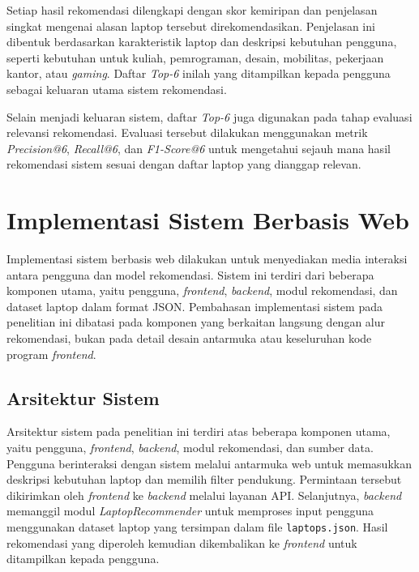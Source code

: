 Setiap hasil rekomendasi dilengkapi dengan skor kemiripan dan penjelasan singkat mengenai alasan laptop tersebut direkomendasikan. Penjelasan ini dibentuk berdasarkan karakteristik laptop dan deskripsi kebutuhan pengguna, seperti kebutuhan untuk kuliah, pemrograman, desain, mobilitas, pekerjaan kantor, atau \textit{gaming}. Daftar \textit{Top-6} inilah yang ditampilkan kepada pengguna sebagai keluaran utama sistem rekomendasi.

Selain menjadi keluaran sistem, daftar \textit{Top-6} juga digunakan pada tahap evaluasi relevansi rekomendasi. Evaluasi tersebut dilakukan menggunakan metrik \textit{Precision@6}, \textit{Recall@6}, dan \textit{F1-Score@6} untuk mengetahui sejauh mana hasil rekomendasi sistem sesuai dengan daftar laptop yang dianggap relevan.

\section{Implementasi Sistem Berbasis Web}
Implementasi sistem berbasis web dilakukan untuk menyediakan media interaksi antara pengguna dan model rekomendasi. Sistem ini terdiri dari beberapa komponen utama, yaitu pengguna, \textit{frontend}, \textit{backend}, modul rekomendasi, dan dataset laptop dalam format JSON. Pembahasan implementasi sistem pada penelitian ini dibatasi pada komponen yang berkaitan langsung dengan alur rekomendasi, bukan pada detail desain antarmuka atau keseluruhan kode program \textit{frontend}.

\subsection{Arsitektur Sistem}
Arsitektur sistem pada penelitian ini terdiri atas beberapa komponen utama, yaitu pengguna, \textit{frontend}, \textit{backend}, modul rekomendasi, dan sumber data. Pengguna berinteraksi dengan sistem melalui antarmuka web untuk memasukkan deskripsi kebutuhan laptop dan memilih filter pendukung. Permintaan tersebut dikirimkan oleh \textit{frontend} ke \textit{backend} melalui layanan API. Selanjutnya, \textit{backend} memanggil modul \textit{LaptopRecommender} untuk memproses input pengguna menggunakan dataset laptop yang tersimpan dalam file \texttt{laptops.json}. Hasil rekomendasi yang diperoleh kemudian dikembalikan ke \textit{frontend} untuk ditampilkan kepada pengguna.

